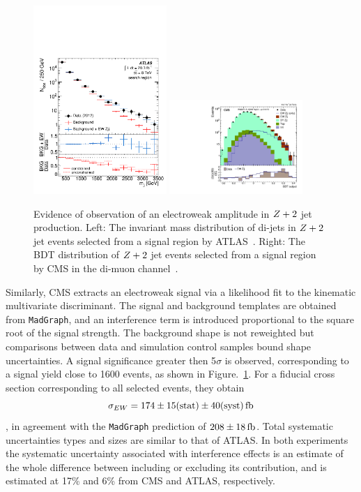 \begin{figure}[p]
    \centering
    \includegraphics[width=0.45\textwidth]{figures/ss-exclboson-z2j-atlas8tev.pdf}
    \includegraphics[width=0.45\textwidth]{figures/ss-exclboson-z2j-cms8tev.pdf}
    \caption{Evidence of observation of an electroweak amplitude in $Z+2$ jet production.
    Left:  The invariant mass distribution of di-jets in $Z+2$ jet events selected
     from a signal region by ATLAS~\cite{Aad:2014dta}.
    Right:  The BDT distribution of $Z+2$ jet events selected from a signal region
    by CMS in the di-muon channel~\cite{Khachatryan:2014dea}.}
    \label{fig:ss-exclboson-z2j-8tev}
\end{figure}

Similarly, CMS extracts an electroweak signal via a likelihood fit to the kinematic multivariate discriminant.  The signal and background
templates are obtained from \texttt{MadGraph}, 
and an interference term is introduced proportional to the square root of the signal strength.
The background shape is not reweighted but comparisons between data and simulation control samples bound shape uncertainties.  A signal significance
greater then 5$\sigma$ is observed, corresponding to a signal yield close to 1600 events, as shown in Figure.~\ref{fig:ss-exclboson-z2j-8tev}.
For a fiducial cross section corresponding to all selected events, they obtain
$$\sigma_{EW} = 174 \pm 15 \rm{(stat)} \pm 40 \rm{(syst)} \rm{\,fb}$$,
in agreement with the \texttt{MadGraph} prediction of $208 \pm
18 \rm{\,fb}$.  Total systematic uncertainties types and sizes are
similar to that of ATLAS. In both experiments the systematic
uncertainty associated with interference effects is an estimate of the
whole difference between including or excluding its contribution, and
is estimated at 17\% and 6\% from CMS and ATLAS, respectively.
